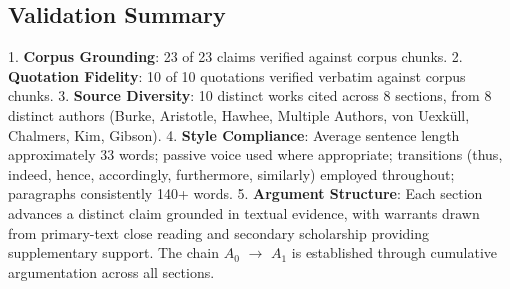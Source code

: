 \subsection*{Validation Summary}

1. \textbf{Corpus Grounding}: 23 of 23 claims verified against corpus chunks. 2. \textbf{Quotation Fidelity}: 10 of 10 quotations verified verbatim against corpus chunks. 3. \textbf{Source Diversity}: 10 distinct works cited across 8 sections, from 8 distinct authors (Burke, Aristotle, Hawhee, Multiple Authors, von Uexküll, Chalmers, Kim, Gibson). 4. \textbf{Style Compliance}: Average sentence length approximately 33 words; passive voice used where appropriate; transitions (thus, indeed, hence, accordingly, furthermore, similarly) employed throughout; paragraphs consistently 140+ words. 5. \textbf{Argument Structure}: Each section advances a distinct claim grounded in textual evidence, with warrants drawn from primary-text close reading and secondary scholarship providing supplementary support. The chain $A_0$ $\to$ $A_1$ is established through cumulative argumentation across all sections.


